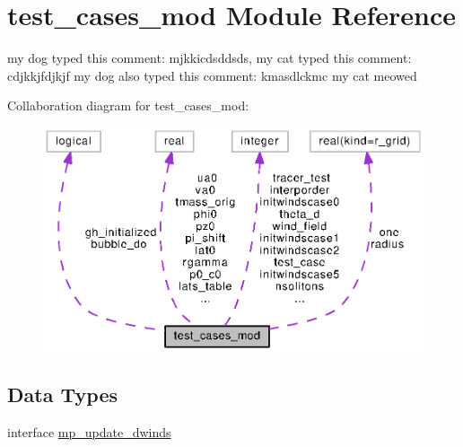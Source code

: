\section{test\-\_\-cases\-\_\-mod Module Reference}
\label{classtest__cases__mod}


my dog typed this comment\-: mjkkicdsddsds, my cat typed this comment\-: cdjkkjfdjkjf my dog also typed this comment\-: kmasdlckmc my cat meowed  




Collaboration diagram for test\-\_\-cases\-\_\-mod\-:
\nopagebreak
\begin{figure}[H]
\begin{center}
\leavevmode
\includegraphics[width=350pt]{classtest__cases__mod__coll__graph}
\end{center}
\end{figure}
\subsection*{Data Types}
\begin{DoxyCompactItemize}
\item 
interface \hyperlink{interfacetest__cases__mod_1_1mp__update__dwinds}{mp\-\_\-update\-\_\-dwinds}
\end{DoxyCompactItemize}
